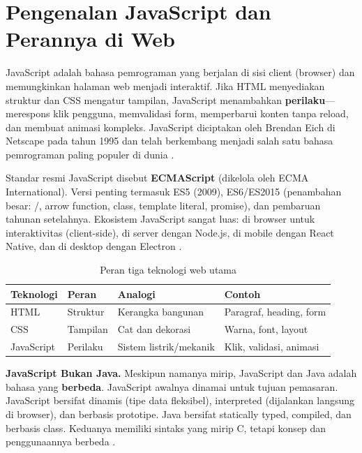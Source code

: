 ﻿\section{Pengenalan JavaScript dan Perannya di Web}

JavaScript adalah bahasa pemrograman yang berjalan di sisi client (browser) dan memungkinkan halaman web menjadi interaktif. Jika HTML menyediakan struktur dan CSS mengatur tampilan, JavaScript menambahkan \textbf{perilaku}---merespons klik pengguna, memvalidasi form, memperbarui konten tanpa reload, dan membuat animasi kompleks. JavaScript diciptakan oleh Brendan Eich di Netscape pada tahun 1995 dan telah berkembang menjadi salah satu bahasa pemrograman paling populer di dunia \cite{jsInfo}.

Standar resmi JavaScript disebut \textbf{ECMAScript} (dikelola oleh ECMA International). Versi penting termasuk ES5 (2009), ES6/ES2015 (penambahan besar: /, arrow function, class, template literal, promise), dan pembaruan tahunan setelahnya. Ekosistem JavaScript sangat luas: di browser untuk interaktivitas (client-side), di server dengan Node.js, di mobile dengan React Native, dan di desktop dengan Electron \cite{mdnJsGuide}.

\begin{table}[H]
\centering
\begin{tabular}{|P{2cm}|P{3cm}|P{3.5cm}|P{3.5cm}|}
\hline
\textbf{Teknologi} & \textbf{Peran} & \textbf{Analogi} & \textbf{Contoh} \\
\hline
HTML & Struktur & Kerangka bangunan & Paragraf, heading, form \\
\hline
CSS & Tampilan & Cat dan dekorasi & Warna, font, layout \\
\hline
JavaScript & Perilaku & Sistem listrik/mekanik & Klik, validasi, animasi \\
\hline
\end{tabular}
\caption{Peran tiga teknologi web utama}
\end{table}

\begin{konsep}
\textbf{JavaScript Bukan Java.} Meskipun namanya mirip, JavaScript dan Java adalah bahasa yang \textbf{berbeda}. JavaScript awalnya dinamai untuk tujuan pemasaran. JavaScript bersifat dinamis (tipe data fleksibel), interpreted (dijalankan langsung di browser), dan berbasis prototipe. Java bersifat statically typed, compiled, dan berbasis class. Keduanya memiliki sintaks yang mirip C, tetapi konsep dan penggunaannya berbeda \cite{jsInfo}.
\end{konsep}

